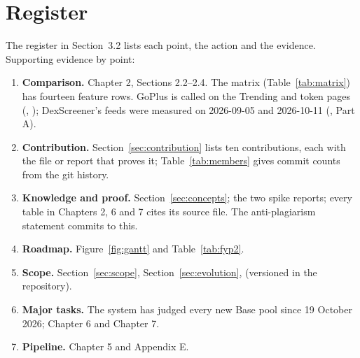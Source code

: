 \section{Register}
The register in Section~3.2 lists each point, the action and the evidence. Supporting evidence by point:
\begin{enumerate}
  \item \textbf{Comparison.} Chapter 2, Sections 2.2--2.4. The matrix (Table~\ref{tab:matrix}) has fourteen feature rows. GoPlus is called on the Trending and token pages (, ); DexScreener's feeds were measured on 2026-09-05 and 2026-10-11 (,  Part A).
  \item \textbf{Contribution.} Section~\ref{sec:contribution} lists ten contributions, each with the file or report that proves it; Table~\ref{tab:members} gives commit counts from the git history.
  \item \textbf{Knowledge and proof.} Section~\ref{sec:concepts}; the two spike reports; every table in Chapters 2, 6 and 7 cites its source file. The anti-plagiarism statement commits to this.
  \item \textbf{Roadmap.} Figure~\ref{fig:gantt} and Table~\ref{tab:fyp2}.
  \item \textbf{Scope.} Section~\ref{sec:scope}, Section~\ref{sec:evolution},  (versioned in the repository).
  \item \textbf{Major tasks.} The system has judged every new Base pool since 19 October 2026; Chapter 6 and Chapter 7.
  \item \textbf{Pipeline.} Chapter 5 and Appendix E.
\end{enumerate}
